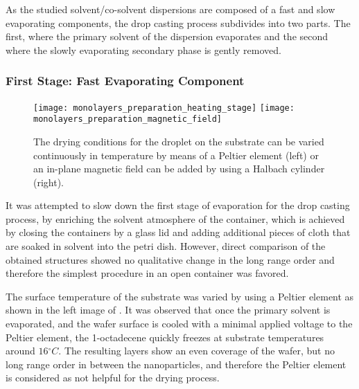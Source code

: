 \documentclass[\main/dresen_thesis.tex]{subfiles}
\begin{document}
  As the studied solvent/co-solvent dispersions are composed of a fast and slow evaporating components, the drop casting process subdivides into two parts.
  The first, where the primary solvent of the dispersion evaporates and the second where the slowly evaporating secondary phase is gently removed.

  \subsubsection{First Stage: Fast Evaporating Component}
    \begin{figure}[tb]
      \centering
      \texttt{[image: monolayers\_preparation\_heating\_stage]}
      \texttt{[image: monolayers\_preparation\_magnetic\_field]}
      \caption{\label{fig:monolayers:preparation:dryingConditions:varyConditions}The drying conditions for the droplet on the substrate can be varied continuously in temperature by means of a Peltier element (left) or an in-plane magnetic field can be added by using a Halbach cylinder (right).}
    \end{figure}
    It was attempted to slow down the first stage of evaporation for the drop casting process, by enriching the solvent atmosphere of the container, which is achieved by closing the containers by a glass lid and adding additional pieces of cloth that are soaked in solvent into the petri dish. %
    However, direct comparison of the obtained structures showed no qualitative change in the long range order and therefore the simplest procedure in an open container was favored.

    The surface temperature of the substrate was varied by using a Peltier element as shown in the left image of . %
    It was observed that once the primary solvent is evaporated, and the wafer surface is cooled with a minimal applied voltage to the Peltier element, the 1-octadecene quickly freezes at substrate temperatures around $16 \unit{^\circ C}$.
    The resulting layers show an even coverage of the wafer, but no long range order in between the nanoparticles, and therefore the Peltier element is considered as not helpful for the drying process.
\end{document}
